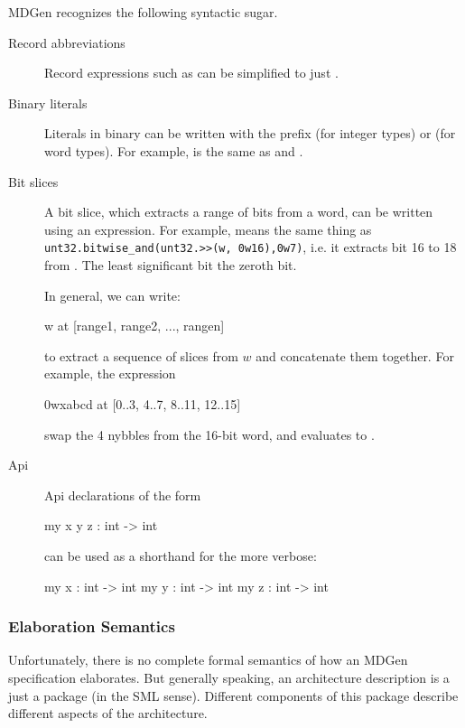    MDGen recognizes the following syntactic sugar.
\begin{description}
\item[Record abbreviations]
Record expressions such as  
can be simplified to just .
\item[Binary literals]
Literals in binary can be written with the prefix  (for integer types)
or  (for word types).   For example,  is the same 
as  and .
\item[Bit slices]
   A bit slice, which extracts a range of bits from a word, can be written
using an  expression.  For example,  
means the same thing as \verb|unt32.bitwise_and(unt32.>>(w, 0w16),0w7)|, i.e.
it extracts bit 16 to 18 from .  
The least significant bit the zeroth bit. 

In general, we can write:
\begin{SML}
  w at [range1, range2, ..., rangen]
\end{SML}
to extract a sequence of slices from $w$ and concatenate them together.
For example, the expression
\begin{SML}
   0wxabcd at [0..3, 4..7, 8..11, 12..15]
\end{SML}
swap the 4 nybbles from the 16-bit word, and evaluates to .

\item[Api]
Api declarations of the form
\begin{SML}
   my x y z : int -> int
\end{SML}
can be used as a shorthand for the more verbose:
\begin{SML}
   my x : int -> int
   my y : int -> int
   my z : int -> int
\end{SML}
\end{description}

\subsubsection{Elaboration Semantics}

   Unfortunately, there is no complete formal semantics of how
an MDGen specification elaborates.  
   But generally speaking, an architecture description is a just a package 
(in the SML sense).   Different components of this package describe 
different aspects of the architecture.

